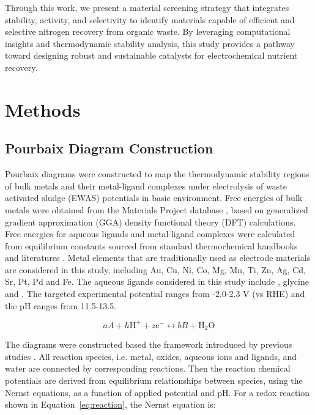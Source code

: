 \documentclass[journal=jacsat,manuscript=article]{achemso}
\begin{document}
Through this work, we present a material screening strategy that integrates stability, activity, and selectivity to identify materials capable of efficient and selective nitrogen recovery from organic waste. By leveraging computational insights and thermodynamic stability analysis, this study provides a pathway toward designing robust and sustainable catalysts for electrochemical nutrient recovery.


\section{Methods}
\subsection{Pourbaix Diagram Construction}
Pourbaix diagrams were constructed to map the thermodynamic stability regions of bulk metals and their metal-ligand complexes under electrolysis of waste activated sludge (EWAS) potentials in basic environment. Free energies of bulk metals were obtained from the Materials Project database \cite{Jain2013TheInnovation}, based on generalized gradient approximation (GGA) density functional theory (DFT) calculations. Free energies for aqueous ligands and metal-ligand complexes were calculated from equilibrium constants sourced from standard thermochemical handbooks \cite{Wagman1982TheUnits, Smith1989CriticalConstants, Bard2017StandardSolution, Bjerrum1957StabilitySubstances} and literatures \cite{Meng1996PrinciplesReview, Azadi2019DataComplexes, Aviles2022ExploringNH3, Oraby2023SelectiveSolutions, Harrington2005DeterminationIon}. Metal elements that are traditionally used as electrode materials are considered in this study, including Au, Cu, Ni, Co, Mg, Mn, Ti, Zn, Ag, Cd, Sr, Pt, Pd and Fe. The aqueous ligands considered in this study include , glycine and . The targeted experimental potential ranges from -2.0-2.3 V (vs RHE) and the pH ranges from 11.5-13.5.

\begin{equation} \label{eq:reaction}
aA + h\text{H}^+ + z\text{e}^- \leftrightarrow bB + \text{H}_2\text{O}
\end{equation}

The diagrams were constructed based the framework introduced by previous studies \cite{PourbaixAtlasSolutions, Huang2017ImprovedCompounds, Huang2015ElectrochemicalCalculations,Singh2017ElectrochemicalMaterials,Patel2019EfficientCompounds,Persson2012PredictionStates}. All reaction species, i.e. metal, oxides, aqueous ions and ligands, and water are connected by corresponding reactions. Then the reaction chemical potentials are derived from equilibrium relationships between species, using the Nernst equations, as a function of applied potential and pH. For a redox reaction shown in Equation~\eqref{eq:reaction}, the Nernst equation is:
\end{document}
